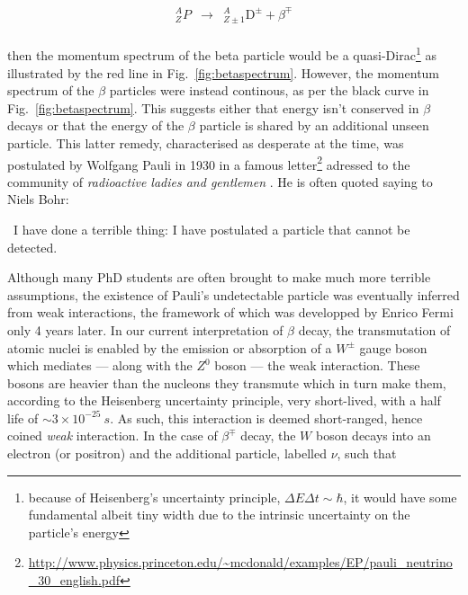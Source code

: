 \begin{equation}
\label{eq:beta_dirac}
\begin{array}{ccc}
^{A}_{Z}P & \longrightarrow & ^{A}_{Z\pm1}\mathrm{D}^{\pm} + \beta^{\mp}
\end{array}
\end{equation} \\ then the momentum spectrum of the beta particle would be a quasi-Dirac\footnote{because of Heisenberg's uncertainty principle, $\Delta E \Delta t \sim \hbar$, it would have some fundamental albeit tiny width due to the intrinsic uncertainty on the particle's energy} as illustrated by the red line in Fig.~\ref{fig:betaspectrum}. However, the momentum spectrum of the $\beta$ particles were instead continous, as per the black curve in  Fig.~\ref{fig:betaspectrum}. This suggests either that energy isn't conserved in $\beta$ decays or that the energy of the $\beta$ particle is shared by an additional unseen particle. This latter remedy, characterised as desperate at the time, was postulated by Wolfgang Pauli in 1930 in a famous letter\footnote{\url{http://www.physics.princeton.edu/~mcdonald/examples/EP/pauli_neutrino_30_english.pdf}} adressed to the community of \guillemotleft \textit{radioactive ladies and gentlemen} \guillemotright. He is often quoted saying to Niels Bohr: \\
\vspace{5pt}
\begin{center}
{\guillemotleft} ~I have done a terrible thing: I have postulated a particle that cannot be detected. ~ {\guillemotright} \\
\end{center}
\vspace{5pt}
Although many PhD students are often brought to make much more terrible assumptions, the existence of Pauli's undetectable particle was eventually inferred from weak interactions, the framework of which was developped by Enrico Fermi only 4 years later. In our current interpretation of $\beta$ decay, the transmutation of atomic nuclei is enabled by the emission or absorption of a $W^{\pm}$ gauge boson which mediates --- along with the $Z^0$ boson --- the weak interaction. These bosons are heavier than the nucleons they transmute which in turn make them, according to the Heisenberg uncertainty principle, very short-lived, with a half life of $\sim 3 \times 10^{-25}~s$. As such, this interaction is deemed short-ranged, hence coined \textit{weak} interaction. In the case of $\beta^{\mp}$ decay, the $W$ boson decays into an electron (or positron) and the additional particle, labelled $\nu$, such that

